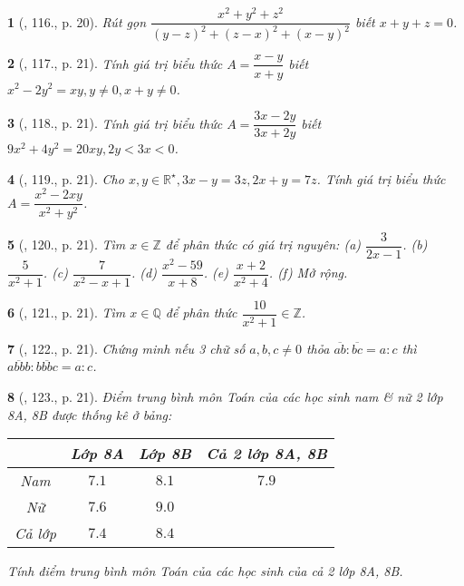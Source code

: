 \documentclass{article}
\newtheorem{baitoan}{}
\begin{document}
\begin{baitoan}[\cite{Binh_Toan_8_tap_1}, 116., p. 20]
	Rút gọn $\dfrac{x^2 + y^2 + z^2}{(y - z)^2 + (z - x)^2 + (x - y)^2}$ biết $x + y + z = 0$.
\end{baitoan}

\begin{baitoan}[\cite{Binh_Toan_8_tap_1}, 117., p. 21]
	Tính giá trị biểu thức $A = \dfrac{x - y}{x + y}$ biết $x^2 - 2y^2 = xy,y\ne0,x + y\ne0$.
\end{baitoan}

\begin{baitoan}[\cite{Binh_Toan_8_tap_1}, 118., p. 21]
	Tính giá trị biểu thức $A = \dfrac{3x - 2y}{3x + 2y}$ biết $9x^2 + 4y^2 = 20xy,2y < 3x < 0$.
\end{baitoan}

\begin{baitoan}[\cite{Binh_Toan_8_tap_1}, 119., p. 21]
	Cho $x,y\in\mathbb{R}^\star,3x - y = 3z,2x + y = 7z$. Tính giá trị biểu thức $A = \dfrac{x^2 - 2xy}{x^2 + y^2}$.
\end{baitoan}

\begin{baitoan}[\cite{Binh_Toan_8_tap_1}, 120., p. 21]
	Tìm $x\in\mathbb{Z}$ để phân thức có giá trị nguyên: (a) $\dfrac{3}{2x - 1}$. (b) $\dfrac{5}{x^2 + 1}$. (c) $\dfrac{7}{x^2 - x + 1}$. (d) $\dfrac{x^2 - 59}{x + 8}$. (e) $\dfrac{x + 2}{x^2 + 4}$. (f) Mở rộng.
\end{baitoan}

\begin{baitoan}[\cite{Binh_Toan_8_tap_1}, 121., p. 21]
	Tìm $x\in\mathbb{Q}$ để phân thức $\dfrac{10}{x^2 + 1}\in\mathbb{Z}$.
\end{baitoan}

\begin{baitoan}[\cite{Binh_Toan_8_tap_1}, 122., p. 21]
	Chứng minh nếu 3 chữ số $a,b,c\ne0$ thỏa $\overline{ab}:\overline{bc} = a:c$ thì $\overline{abbb}:\overline{bbbc} = a:c$.
\end{baitoan}

\begin{baitoan}[\cite{Binh_Toan_8_tap_1}, 123., p. 21]
	Điểm trung bình môn Toán của các học sinh nam \& nữ 2 lớp 8A, 8B được thống kê ở bảng:
	\begin{table}[H]
		\centering
		\begin{tabular}{|c|c|c|c|}
			\hline
			& Lớp 8A & Lớp 8B & Cả 2 lớp 8A, 8B \\
			\hline
			Nam & $7.1$ & $8.1$ & $7.9$ \\
			\hline
			Nữ & $7.6$ & $9.0$ &  \\
			\hline
			Cả lớp & $7.4$ & $8.4$ &  \\
			\hline
		\end{tabular}
	\end{table}
	\noindent Tính điểm trung bình môn Toán của các học sinh của cả 2 lớp 8A, 8B.
\end{baitoan}
\end{document}
